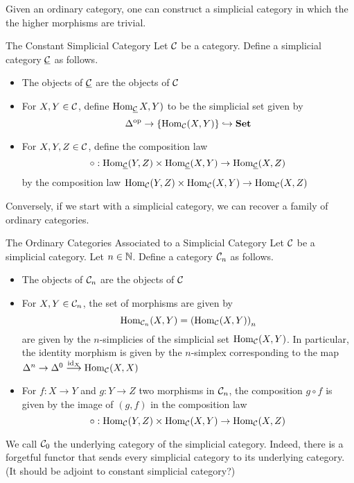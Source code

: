 \documentclass[a4paper]{article}
\begin{document}
Given an ordinary category, one can construct a simplicial category in which the the higher morphisms are trivial. 

\begin{defn}{The Constant Simplicial Category}{} Let $\mathcal{C}$ be a category. Define a simplicial category $\underline{\mathcal{C}}$ as follows. 
\begin{itemize}
\item The objects of $\underline{\mathcal{C}}$ are the objects of $\mathcal{C}$
\item For $X,Y\in\mathcal{C}$, define $\operatorname{Hom}_{\underline{\mathcal{C}}}X,Y)$ to be the simplicial set given by $$\Delta^\text{op}\to\{\operatorname{Hom}_{\mathcal{C}}(X,Y)\}\hookrightarrow\bold{Set}$$
\item For $X,Y,Z\in\mathcal{C}$, define the composition law $$\circ:\operatorname{Hom}_{\underline{\mathcal{C}}}(Y,Z)\times\operatorname{Hom}_{\underline{\mathcal{C}}}(X,Y)\to\operatorname{Hom}_{\underline{\mathcal{C}}}(X,Z)$$ by the composition law $\operatorname{Hom}_{\mathcal{C}}(Y,Z)\times\operatorname{Hom}_{\mathcal{C}}(X,Y)\to\operatorname{Hom}_{\mathcal{C}}(X,Z)$
\end{itemize}
\end{defn}

Conversely, if we start with a simplicial category, we can recover a family of ordinary categories. 

\begin{defn}{The Ordinary Categories Associated to a Simplicial Category}{} Let $\mathcal{C}$ be a simplicial category. Let $n\in\mathbb{N}$. Define a category $\mathcal{C}_n$ as follows. 
\begin{itemize}
\item The objects of $\mathcal{C}_n$ are the objects of $\mathcal{C}$
\item For $X,Y\in\mathcal{C}_n$, the set of morphisms are given by $$\operatorname{Hom}_{\mathcal{C}_n}(X,Y)=\left(\operatorname{Hom}_{\mathcal{C}}(X,Y)\right)_n$$ are given by the $n$-simplicies of the simplicial set $\operatorname{Hom}_{\mathcal{C}}(X,Y)$. In particular, the identity morphism is given by the $n$-simplex corresponding to the map $\Delta^n\to\Delta^0\overset{\text{id}_X}{\longrightarrow}\operatorname{Hom}_{\mathcal{C}}(X,X)$
\item For $f:X\to Y$ and $g:Y\to Z$ two morphisms in $\mathcal{C}_n$, the composition $g\circ f$ is given by the image of $(g,f)$ in the composition law $$\circ:\operatorname{Hom}_{\mathcal{C}}(Y,Z)\times\operatorname{Hom}_{\mathcal{C}}(X,Y)\to\operatorname{Hom}_{\mathcal{C}}(X,Z)$$
\end{itemize}
\end{defn}

We call $\mathcal{C}_0$ the underlying category of the simplicial category. Indeed, there is a forgetful functor that sends every simplicial category to its underlying category. (It should be adjoint to constant simplicial category?)
\end{document}
